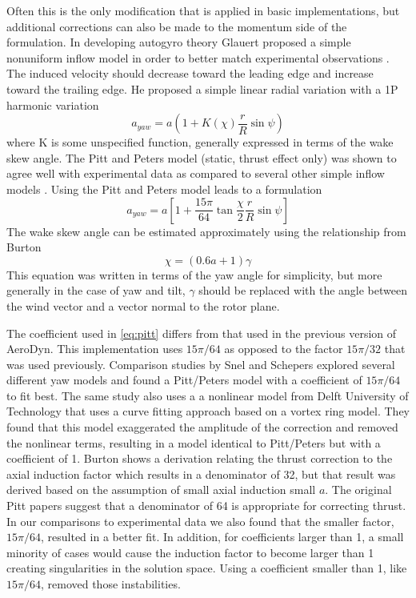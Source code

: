 \documentclass[]{aiaa-tc}%
\begin{document}
Often this is the only modification that is applied in basic implementations, but additional corrections can also be made to the momentum side of the formulation.  In developing autogyro theory Glauert proposed a simple nonuniform inflow model in order to better match experimental observations \cite{Glauert1926}.  The induced velocity should decrease toward the leading edge and increase toward the trailing edge.  He proposed a simple linear radial variation with a 1P harmonic variation
\begin{equation}
    a_{yaw} = a \left( 1 + K(\chi) \frac{r}{R}\sin\psi\right)
\end{equation}
where K is some unspecified function, generally expressed in terms of the wake skew angle.  The Pitt and Peters model (static, thrust effect only) was shown to agree well with experimental data as compared to several other simple inflow models \cite{Chen:1989}.  Using the Pitt and Peters model leads to a formulation
\begin{equation}
    a_{yaw} = a \left[ 1 + \frac{15 \pi}{64}\tan\frac{\chi}{2}\frac{r}{R}\sin\psi\right]
    \label{eq:pitt}
\end{equation}
The wake skew angle can be estimated approximately using the relationship from Burton\cite{Burton2011}
\begin{equation}
    \chi = (0.6 a + 1) \gamma
\end{equation}
This equation was written in terms of the yaw angle for simplicity, but more generally in the case of yaw and tilt, $\gamma$ should be replaced with the angle between the wind vector and a vector normal to the rotor plane.

The coefficient used in \cref{eq:pitt} differs from that used in the previous version of AeroDyn.  This implementation uses $15 \pi/64$ as opposed to the factor $15 \pi/32$ that was used previously.  Comparison studies by Snel and Schepers \cite{Snel1995} explored several different yaw models and found a Pitt/Peters model with a coefficient of $15 \pi/64$ to fit best.  The same study also uses a  a nonlinear model from Delft University of Technology that uses a curve fitting approach based on a vortex ring model.  They found that this model exaggerated the amplitude of the correction and removed the nonlinear terms, resulting in a model identical to Pitt/Peters but with a coefficient of 1.  Burton \cite{Burton2011} shows a derivation relating the thrust correction to the axial induction factor which results in a denominator of 32, but that result was derived based on the assumption of small axial induction small $a$.  The original Pitt papers \cite{Pitt1981} suggest that a denominator of 64 is appropriate for correcting thrust.  In our comparisons to experimental data we also found that the smaller factor, $15 \pi/64$, resulted in a better fit.  In addition, for coefficients larger than 1, a small minority of cases would cause the induction factor to become larger than 1 creating singularities in the solution space.  Using a coefficient smaller than 1, like $15 \pi/64$, removed those instabilities.
\end{document}
